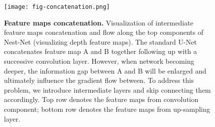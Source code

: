 \documentclass[runningheads]{llncs}
\newcommand{\bd}[1]{\textbf{#1}}
\begin{document}
\begin{figure}[t]
\begin{center}
\texttt{[image: fig-concatenation.png]}
\end{center}
\caption{\bd{Feature maps concatenation.} Visualization of intermediate feature maps concatenation and flow along the top components of Nest-Net (visualizing depth  feature maps). The standard U-Net concatenates feature map A and B together following up with a successive convolution layer. However, when network becoming deeper, the information gap between A and B will be enlarged and ultimately influence the gradient flow between. To address this problem, we introduce intermediate layers and skip connecting them accordingly. Top row denotes the feature maps from convolution component; bottom row denotes the feature maps from up-sampling layer.}
\label{fig:concatenation}
\end{figure}


\fi
\end{document}
